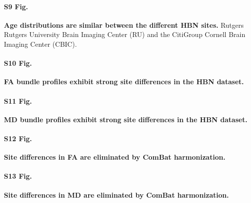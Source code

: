 \documentclass[10pt,letterpaper]{article}
\begin{document}
\paragraph*{S9 Fig.}
\label{S9_Fig}
{\bf Age distributions are similar between the different HBN sites.}
Rutgers Rutgers University Brain Imaging Center (RU) and the CitiGroup Cornell Brain Imaging Center (CBIC).

\paragraph*{S10 Fig.}
\label{S10_Fig}
{\bf FA bundle profiles exhibit strong site differences in the HBN dataset.}

\paragraph*{S11 Fig.}
\label{S11_Fig}
{\bf MD bundle profiles exhibit strong site differences in the HBN dataset.}

\paragraph*{S12 Fig.}
\label{S12_Fig}
{\bf Site differences in FA are eliminated by ComBat harmonization.}

\paragraph*{S13 Fig.}
\label{S13_Fig}
{\bf Site differences in MD are eliminated by ComBat harmonization.}
\end{document}
